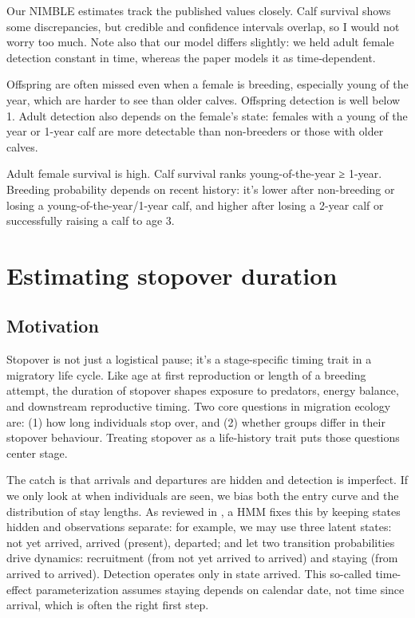 \documentclass[
  12pt,
]{krantz}
\begin{document}
Our NIMBLE estimates track the published values closely. Calf survival shows some discrepancies, but credible and confidence intervals overlap, so I would not worry too much. Note also that our model differs slightly: we held adult female detection constant in time, whereas the paper models it as time‐dependent.

Offspring are often missed even when a female is breeding, especially young of the year, which are harder to see than older calves. Offspring detection is well below 1. Adult detection also depends on the female's state: females with a young of the year or 1-year calf are more detectable than non-breeders or those with older calves.

Adult female survival is high. Calf survival ranks young-of-the-year ≥ 1-year. Breeding probability depends on recent history: it's lower after non-breeding or losing a young-of-the-year/1-year calf, and higher after losing a 2-year calf or successfully raising a calf to age 3.

\section{Estimating stopover duration}\label{estimating-stopover-duration}

\subsection{Motivation}\label{motivation-8}

Stopover is not just a logistical pause; it's a stage-specific timing trait in a migratory life cycle. Like age at first reproduction or length of a breeding attempt, the duration of stopover shapes exposure to predators, energy balance, and downstream reproductive timing. Two core questions in migration ecology are: (1) how long individuals stop over, and (2) whether groups differ in their stopover behaviour. Treating stopover as a life-history trait puts those questions center stage.

The catch is that arrivals and departures are hidden and detection is imperfect. If we only look at when individuals are seen, we bias both the entry curve and the distribution of stay lengths. As reviewed in \citet{guerin_advances_2017}, a HMM fixes this by keeping states hidden and observations separate: for example, we may use three latent states: not yet arrived, arrived (present), departed; and let two transition probabilities drive dynamics: recruitment (from not yet arrived to arrived) and staying (from arrived to arrived). Detection operates only in state arrived. This so-called time-effect parameterization assumes staying depends on calendar date, not time since arrival, which is often the right first step.
\end{document}
